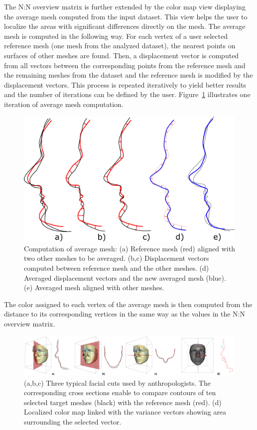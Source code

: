\documentclass[final,5p,times]{elsarticle}
\begin{document}
The N:N overview matrix is further extended by the color map view displaying the average mesh computed from the input dataset. 
This view helps the user to localize the areas with significant differences directly on the mesh.
The average mesh is computed in the following way.
For each vertex of a user selected reference mesh (one mesh from the analyzed dataset), the nearest points on surfaces of other meshes are found.
Then, a displacement vector is computed from all vectors between the corresponding points from the reference mesh and the remaining meshes from the dataset and the reference mesh is modified by the displacement vectors.
This process is repeated iteratively to yield better results and the number of iterations can be defined by the user. Figure~\ref{fig:average} illustrates one iteration of average mesh computation.

\begin{figure}[htb]
	\centering
  \includegraphics[width=0.9\linewidth]{pictures/average.pdf}
  \caption{\label{fig:average} Computation of average mesh: (a) Reference mesh (red) aligned with two other meshes to be averaged. (b,c) Displacement vectors computed between reference mesh and the other meshes. (d) Averaged displacement vectors and the new averaged mesh (blue). (e) Averaged mesh aligned with other meshes.}
	\vspace{-3mm}
\end{figure}

The color assigned to each vertex of the average mesh is then computed from the distance to its corresponding vertices in the same way as the values in the N:N overview matrix.

\begin{figure}[htb]
	\centering
  \includegraphics[width=0.9\linewidth]{pictures/cross.png}
  \caption{\label{fig:cross} (a,b,c) Three typical facial cuts used by anthropologists. The corresponding cross sections enable to compare contours of ten selected target meshes (black) with the reference mesh (red). (d) Localized color map linked with the variance vectors showing area surrounding the selected vector.}
	\vspace{-3mm}
\end{figure}
\end{document}
